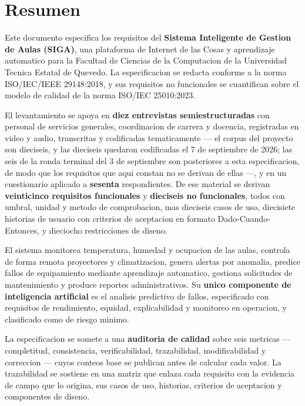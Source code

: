 \documentclass[11pt,a4paper]{article}
\begin{document}
\newpage

\section*{Resumen}

Este documento especifica los requisitos del \textbf{Sistema Inteligente de Gestion de
Aulas (SIGA)}, una plataforma de Internet de las Cosas y aprendizaje automatico para la
Facultad de Ciencias de la Computacion de la Universidad Tecnica Estatal de Quevedo. La
especificacion se redacta conforme a la norma ISO/IEC/IEEE 29148:2018, y sus requisitos no
funcionales se cuantifican sobre el modelo de calidad de la norma ISO/IEC 25010:2023.

El levantamiento se apoya en \textbf{diez entrevistas semiestructuradas} con personal de
servicios generales, coordinacion de carrera y docencia, registradas en video y audio,
transcritas y codificadas tematicamente --- el corpus del proyecto son dieciseis, y las
dieciseis quedaron codificadas el 7 de septiembre de 2026; las seis de la ronda terminal
del 3 de septiembre son posteriores a esta especificacion, de modo que los requisitos que
aqui constan no se derivan de ellas ---, y en un cuestionario aplicado a \textbf{sesenta}
respondientes. De ese material se derivan \textbf{veinticinco requisitos funcionales} y
\textbf{dieciseis no funcionales}, todos con umbral, unidad y metodo de comprobacion, mas
dieciseis casos de uso, diecisiete historias de usuario con criterios de aceptacion en
formato Dado-Cuando-Entonces, y dieciocho restricciones de diseno.

El sistema monitorea temperatura, humedad y ocupacion de las aulas, controla de forma
remota proyectores y climatizacion, genera alertas por anomalia, predice fallos de
equipamiento mediante aprendizaje automatico, gestiona solicitudes de mantenimiento y
produce reportes administrativos. Su \textbf{unico componente de inteligencia artificial}
es el analisis predictivo de fallos, especificado con requisitos de rendimiento, equidad,
explicabilidad y monitoreo en operacion, y clasificado como de riesgo minimo.

La especificacion se somete a una \textbf{auditoria de calidad} sobre seis metricas
--- completitud, consistencia, verificabilidad, trazabilidad, modificabilidad y correccion
--- cuyos conteos base se publican antes de calcular cada valor. La trazabilidad se
sostiene en una matriz que enlaza cada requisito con la evidencia de campo que lo origina,
sus casos de uso, historias, criterios de aceptacion y componentes de diseno.
\end{document}
